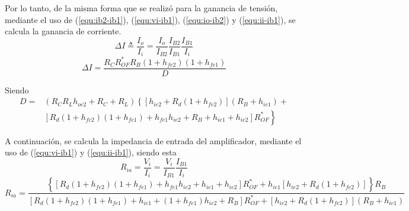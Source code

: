 Por lo tanto, de la misma forma que se realizó para la ganancia de tensión, mediante el uso de (\ref{equ:ib2-ib1}), (\ref{equ:vi-ib1}), (\ref{equ:io-ib2}) y (\ref{equ:ii-ib1}), se calcula la ganancia de corriente.
\begin{equation*}
	\Delta I \triangleq \frac{I_o}{I_i} = \frac{I_o}{I_{B2}} \frac{I_{B2}}{I_{B1}} \frac{I_{B1}}{I_i}
\end{equation*}
\begin{equation}
	\Delta I = \frac { R_C R_{OF}^* R_B \left( 1+h_{fe2} \right) \left( 1+h_{fe1} \right)}{D}
\end{equation}

Siendo
\begin{equation}
\begin{split}
D = & \left( R_C R_L h_{oe2}+R_C+R_L \right)  \left\lbrace \left[ h_{ie2} + R_d \left( 1+h_{fe2} \right) \right] \left( R_B+h_{ie1} \right) + \right. \\
& \left. \left[ R_d \left( 1+h_{fe2} \right)  \left( 1+h_{fe1} \right) + h_{fe1} h_{ie2} + R_B + h_{ie1} + h_{ie2} \right] R_{OF}^* \right\rbrace
\end{split}
\end{equation}

A continuación, se calcula la impedancia de entrada del amplificador, mediante el uso de (\ref{equ:vi-ib1}) y (\ref{equ:ii-ib1}), siendo esta
\begin{equation*}
	R_{ia} = \frac{V_i}{I_i} =  \frac{V_i}{I_{B1}}\frac{I_{B1}}{I_i}
\end{equation*}
\begin{equation}
R_{ia} = \frac{\left\lbrace  \left[ R_{d} \left( 1+h_{fe2} \right) \left( 1+h_{fe1} \right) + h_{fe1}h_{ie2} + h_{ie1} + h_{ie2} \right] R_{OF}^* + h_{ie1} \left[ h_{ie2} + R_{d} \left( 1 + h_{fe2} \right) \right] \right\rbrace R_{B}}{\left[ R_{d} \left( 1+h_{fe2} \right) \left( 1 + h_{fe1} \right) + h_{ie1} + \left( 1 + h_{fe1} \right) h_{ie2} + R_{B} \right] R_{OF}^* + \left[ h_{ie2} + R_{d} \left( 1 + h_{fe2} \right) \right] \left( R_{B} + h_{ie1} \right)}
\end{equation}

